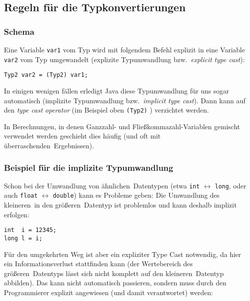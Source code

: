 \subsection{Regeln für die Typkonvertierungen}

\subsubsection{Schema}

Eine Variable \lstinline|var1| vom Typ  wird mit folgendem Befehl
explizit in eine Variable \lstinline|var2| vom Typ  umgewandelt
(explizite Typumwandlung bzw.\ \emph{explicit type cast}):

\begin{lstlisting}
Typ2 var2 = (Typ2) var1;
\end{lstlisting}

In einigen wenigen fällen erledigt Java diese Typumwandlung für uns sogar
automatisch (implizite Typumwandlung bzw.\ \emph{implicit type cast}). Dann kann
auf den \emph{type cast operator} (im Beispiel oben \lstinline|(Typ2)| )
verzichtet werden.

In Berechnungen, in denen Ganzzahl- und Fließkommazahl-Variablen gemischt
verwendet werden geschieht dies häufig (und oft mit \glqq überraschenden\grqq\
Ergebnissen).

\subsubsection{Beispiel für die implizite Typumwandlung}

Schon bei der Umwandlung von \glqq ähnlichen\grqq\ Datentypen
(etwa \lstinline|int| $\leftrightarrow$ \lstinline|long|, oder auch
\lstinline|float| $\leftrightarrow$ \lstinline|double|) kann es Probleme geben:
Die Umwandlung des \glqq kleineren\grqq\ in den \glqq größeren\grqq\ Datentyp
ist problemlos und kann deshalb implizit erfolgen:

\begin{lstlisting}
int  i = 12345;
long l = i;
\end{lstlisting}

Für den umgekehrten Weg ist aber ein expliziter Type Cast notwendig, da hier ein
Informationsverlust stattfinden kann (der Wertebereich des \glqq größeren\grqq\
Datentyps lässt sich nicht komplett auf den \glqq kleineren\grqq\ Datentyp
abbilden). Das kann nicht automatisch passieren, sondern muss durch den
Programmierer explizit angewiesen (und damit verantwortet) werden:

